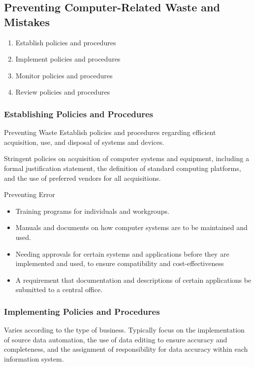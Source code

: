 \documentclass[\main/notes.tex]{subfiles}
\begin{document}
			\subsection{Preventing Computer-Related Waste and Mistakes}
				\begin{enumerate}[nosep]
					\item Establish policies and procedures
					\item Implement policies and procedures
					\item Monitor policies and procedures
					\item Review policies and procedures
				\end{enumerate}
				\subsubsection{Establishing Policies and Procedures}
					\begin{sidenote}{Preventing Waste}
						Establish policies and procedures regarding efficient acquisition, use, and disposal of systems and devices.

						Stringent policies on acquisition of computer systems and equipment, including a formal justification statement, the definition of standard computing platforms, and the use of preferred vendors for all acquisitions.
					\end{sidenote}
					\begin{sidenote}{Preventing Error}
						\begin{itemize}[nosep]
							\item Training programs for individuals and workgroups.
							\item Manuals and documents on how computer systems are to be maintained and used.
							\item Needing approvals for certain systems and applications before they are implemented and used, to ensure compatibility and cost-effectiveness
							\item A requirement that documentation and descriptions of certain applications be submitted to a central office.
						\end{itemize}
					\end{sidenote}
				\subsubsection{Implementing Policies and Procedures}
					Varies according to the type of business. Typically focus on the implementation of source data automation, the use of data editing to ensure accuracy and completeness, and the assignment of responsibility for data accuracy within each information system.
\end{document}
